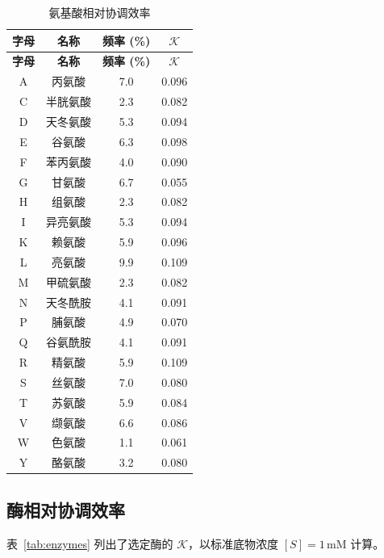 \documentclass[12pt,a4paper]{article}
\newcommand{\REL}{\mathcal{K}}          %
\begin{document}
	\begin{longtable}{|c|c|c|c|}
		\caption{氨基酸相对协调效率}\label{tab:amino}\\
		\hline
		\textbf{字母} & \textbf{名称} & \textbf{频率 (\%)} & \(\REL\) \\
		\hline
		\endfirsthead
		\hline
		\textbf{字母} & \textbf{名称} & \textbf{频率 (\%)} & \(\REL\) \\
		\hline
		\endhead
		\hline
		A & 丙氨酸 & 7.0 & 0.096 \\
		C & 半胱氨酸 & 2.3 & 0.082 \\
		D & 天冬氨酸 & 5.3 & 0.094 \\
		E & 谷氨酸 & 6.3 & 0.098 \\
		F & 苯丙氨酸 & 4.0 & 0.090 \\
		G & 甘氨酸 & 6.7 & 0.055 \\
		H & 组氨酸 & 2.3 & 0.082 \\
		I & 异亮氨酸 & 5.3 & 0.094 \\
		K & 赖氨酸 & 5.9 & 0.096 \\
		L & 亮氨酸 & 9.9 & 0.109 \\
		M & 甲硫氨酸 & 2.3 & 0.082 \\
		N & 天冬酰胺 & 4.1 & 0.091 \\
		P & 脯氨酸 & 4.9 & 0.070 \\
		Q & 谷氨酰胺 & 4.1 & 0.091 \\
		R & 精氨酸 & 5.9 & 0.109 \\
		S & 丝氨酸 & 7.0 & 0.080 \\
		T & 苏氨酸 & 5.9 & 0.084 \\
		V & 缬氨酸 & 6.6 & 0.086 \\
		W & 色氨酸 & 1.1 & 0.061 \\
		Y & 酪氨酸 & 3.2 & 0.080 \\
		\hline
	\end{longtable}
	
	\subsection{酶相对协调效率}
	\label{sec:enzymes}
	表~\ref{tab:enzymes} 列出了选定酶的 \(\REL\)，以标准底物浓度 \([S]=1\,\text{mM}\) 计算。
	
\end{document}
